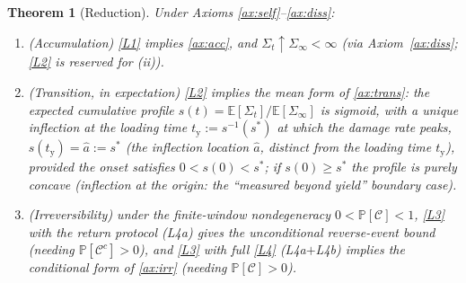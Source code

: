\documentclass[11pt]{article}
\theoremstyle{plain}
\newtheorem{theorem}{Theorem}[section]
\theoremstyle{definition}
\theoremstyle{remark}
\newcommand{\E}{\mathbb{E}}
\begin{document}
\begin{theorem}[Reduction]\label{thm:reduction}
Under Axioms \ref{ax:self}--\ref{ax:diss}:
\begin{enumerate}[label=(\roman*),leftmargin=2.2em]
\item \emph{(}Accumulation\emph{)} \ref{L1} implies \ref{ax:acc}, and $\Sigma_t\uparrow\Sigma_\infty<\infty$ (via Axiom~\ref{ax:diss}; \ref{L2} is reserved for (ii)).
\item \emph{(}Transition, in expectation\emph{)} \ref{L2} implies the mean form of \ref{ax:trans}: the expected cumulative profile $s(t)=\E[\Sigma_t]/\E[\Sigma_\infty]$ is sigmoid, with a unique inflection at the loading time $t_{\mathrm y}:=s^{-1}(s^\ast)$ at which the damage rate peaks, $s(t_{\mathrm y})=\hat a:=s^\ast$ (the inflection \emph{location} $\hat a$, distinct from the loading \emph{time} $t_{\mathrm y}$), provided the onset satisfies $0<s(0)<s^\ast$; if $s(0)\ge s^\ast$ the profile is purely concave (inflection at the origin: the ``measured beyond yield'' boundary case).
\item \emph{(}Irreversibility\emph{)} under the finite-window nondegeneracy $0<\mathbb P[\mathcal C]<1$, \ref{L3} with the return protocol (L4a) gives the unconditional reverse-event bound (needing $\mathbb P[\mathcal C^c]>0$), and \ref{L3} with full \ref{L4} (L4a$+$L4b) implies the conditional form of \ref{ax:irr} (needing $\mathbb P[\mathcal C]>0$).
\end{enumerate}
\end{theorem}
\end{document}
